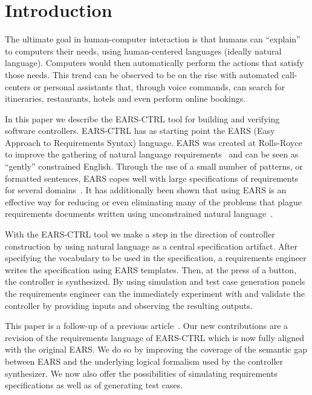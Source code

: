 \section{Introduction}

The ultimate goal in human-computer interaction is that humans can ``explain''
to computers their needs, using human-centered languages (ideally natural
language). Computers would then automatically perform the actions that
satisfy those needs. This trend can be observed to be on the rise with automated
call-centers or personal assistants that, through voice commands, can
search for itineraries, restaurants, hotels and even perform online bookings.

In this paper we describe the \textsf{EARS-CTRL} tool for building and verifying
software controllers. \textsf{EARS-CTRL} has as starting point the EARS (Easy
Approach to Requirements Syntax) language. EARS was created at Rolls-Royce to
improve the gathering of natural language requirements~\cite{EARS09} and can be
seen as ``gently'' constrained English. Through the use of a small number of
patterns, or formatted sentences, EARS copes well with large  specifications of
requirements for several domains~\cite{EARS10,EARS16}. It has additionally been
shown that using EARS is an effective way for reducing or even eliminating many
of the problems that plague requirements documents written using unconstrained
natural language~\cite{EARS09}.

With the \textsf{EARS-CTRL} tool we make a step in the direction of controller
construction by using natural language as a central specification artifact.
After specifying the vocabulary to be used in the specification, a requirements
engineer writes the specification using EARS templates. Then, at the press of a
button, the controller is synthesized. By using simulation and test case
generation panels the requirements engineer can the immediately experiment with
and validate the controller by providing inputs and observing the resulting
outputs.

This paper is a follow-up of a previous article~\cite{LucioRCM17}.
Our new contributions are a revision of the requirements language of
\textsf{EARS-CTRL} which is now fully aligned with the original EARS. We do so
by improving the coverage of the semantic gap between EARS and the underlying
logical formalism used by the controller synthesizer. We now also offer the
possibilities of simulating requirements specifications as well as of generating test cases.

